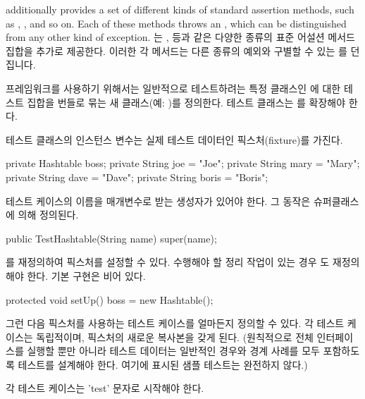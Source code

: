 \documentclass[a4paper,10pt,twoside]{book}
\begin{document}
 additionally provides a set of different kinds of standard assertion methods, such as , , and so on. Each of these methods throws an , which can be distinguished from any other kind of exception.
는 ,  등과 같은 다양한 종류의 표준 어설션 메서드 집합을 추가로 제공한다. 이러한 각 메서드는 다른 종류의 예외와 구별할 수 있는 를 던집니다.

프레임워크를 사용하기 위해서는 일반적으로 테스트하려는 특정 클래스인 에 대한 테스트 집합을 번들로 묶는 새 클래스(예: )를 정의한다. 테스트 클래스는 를 확장해야 한다.

\begin{code}
import junit.framework.*;
import java.util.Hashtable;

public class TestHashtable extends TestCase {
\end{code}

테스트 클래스의 인스턴스 변수는 실제 테스트 데이터인 픽스처(fixture)를 가진다.

\begin{code}
	private Hashtable boss;
	private String joe = "Joe";
	private String mary = "Mary";
	private String dave = "Dave";
	private String boris = "Boris";
\end{code}

테스트 케이스의 이름을 매개변수로 받는 생성자가 있어야 한다. 그 동작은 슈퍼클래스에 의해 정의된다.

\begin{code}
	public TestHashtable(String name) {
		super(name);
	}
\end{code}

 를 재정의하여 픽스처를 설정할 수 있다. 수행해야 할 정리 작업이 있는 경우 도 재정의해야 한다. 기본 구현은 비어 있다.

\begin{code}
	protected void setUp() {
		boss = new Hashtable();
	}
\end{code}

그런 다음 픽스처를 사용하는 테스트 케이스를 얼마든지 정의할 수 있다. 각 테스트 케이스는 독립적이며, 픽스처의 새로운 복사본을 갖게 된다. (원칙적으로 전체 인터페이스를 실행할 뿐만 아니라 테스트 데이터는 일반적인 경우와 경계 사례를 모두 포함하도록 테스트를 설계해야 한다. 여기에 표시된 샘플 테스트는 완전하지 않다.) 

각 테스트 케이스는 'test' 문자로 시작해야 한다.
\end{document}
